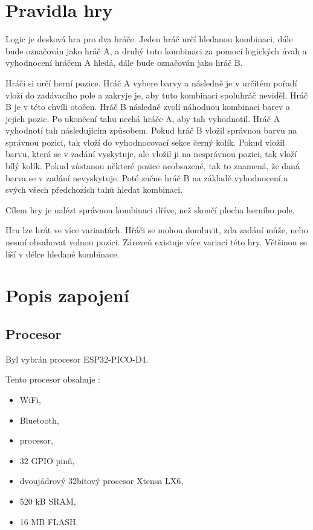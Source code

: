 \chapter{Pravidla hry}
Logic je desková hra pro dva hráče. Jeden hráč určí hledanou kombinaci, dále bude označován jako hráč A, a druhý tuto kombinaci 
za pomocí logických úvah a
vyhodnocení hráčem A hledá, dále bude označován jako hráč B.

Hráči si určí herní pozice. Hráč A vybere barvy a následně je v určitém pořadí vloží do zadávacího pole a zakryje je, aby tuto
kombinaci spoluhráč neviděl. Hráč B je v této chvíli otočen. Hráč B následně zvolí náhodnou kombinaci barev a jejich pozic. Po 
ukončení tahu nechá
hráče A, aby tah vyhodnotil. Hráč A vyhodnotí tah následujícím způsobem. Pokud hráč B vložil správnou barvu na správnou pozici, tak vloží 
do vyhodnocovací sekce černý kolík. Pokud vložil barvu, která se v zadání vyskytuje, ale vložil ji na nesprávnou pozici, tak vloží bílý kolík.
Pokud zůstanou některé pozice neobsazené, tak to znamená, že daná barva se v zadání nevyskytuje. Poté začne hráč B na základě vyhodnocení a 
svých všech předchozích tahů hledat kombinaci.

Cílem hry je nalézt správnou kombinaci dříve, než skončí plocha herního pole.

Hru lze hrát ve více variantách. Hřáči se mohou domluvit, zda zadání může, nebo nesmí obsahovat volnou pozici. Zároveň existuje 
více variací této hry. Většinou se liší v délce hledané kombinace.

\chapter{Popis zapojení}

\section{Procesor}
Byl vybrán procesor ESP32-PICO-D4.

Tento procesor obsahuje \cite{PICO_datasheet}: %
\begin{itemize}
    \item WiFi,
    \item Bluetooth,
    \item procesor,
    \item 32 GPIO pinů,
    \item dvoujádrový 32bitový procesor Xtensa LX6,
    \item 520 kB SRAM, %
    \item 16 MB FLASH. %
  \end{itemize}

